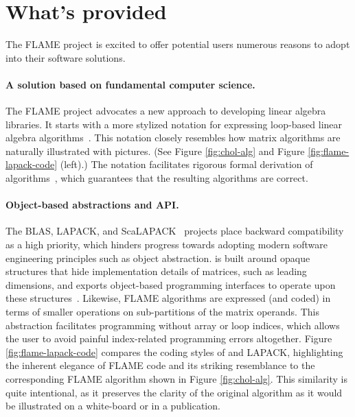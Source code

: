 \section{What's provided}


The FLAME project is excited to offer potential users numerous reasons to
adopt \libflame into their software solutions.

\paragraph{A solution based on fundamental computer science.}
The FLAME project advocates a new approach to developing linear algebra
libraries.
It starts with a more stylized notation for
expressing loop-based linear algebra algorithms~\cite{inverse-siam,FLAME_WoCo,FLAME,TSoPMC}.
This notation closely resembles how matrix algorithms are naturally
illustrated with pictures.
(See Figure \ref{fig:chol-alg} and Figure \ref{fig:flame-lapack-code} (left).) 
The notation facilitates rigorous formal derivation of algorithms~\cite{FLAME,Recipe,TSoPMC}, which guarantees that the resulting algorithms are correct.

\paragraph{Object-based abstractions and API.}
The BLAS, LAPACK, and ScaLAPACK~\cite{ScaLAPACK} projects place
backward compatibility as a high priority, which hinders progress
towards adopting modern software engineering principles such as object
abstraction.  \libflame is built around opaque structures that hide
implementation details of matrices, such as leading dimensions, and
exports object-based programming interfaces to operate upon these
structures~\cite{FLAME:API}.  Likewise, FLAME algorithms are expressed (and coded) in
terms of smaller operations on sub-partitions of the matrix operands.
This abstraction facilitates programming without array or loop
indices, which allows the user to avoid painful index-related
programming errors altogether.  Figure \ref{fig:flame-lapack-code}
compares the coding styles of \libflame and LAPACK, highlighting the
inherent elegance of FLAME code and its striking resemblance to the
corresponding FLAME algorithm shown in Figure \ref{fig:chol-alg}.
This similarity is quite intentional, as it preserves the clarity of
the original algorithm as it would be illustrated on a white-board or
in a publication.

